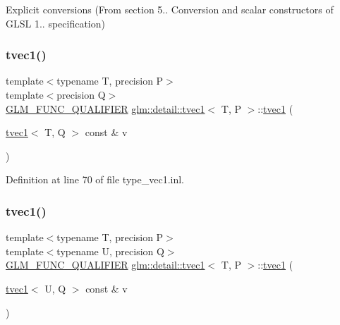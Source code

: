 Explicit conversions (From section 5.. Conversion and scalar constructors of G\+L\+SL 1.. specification) 

\mbox{\label{structglm_1_1detail_1_1tvec1_a78ba11094b516ebbb487a9c37714d7c0}} 
\subsubsection{\texorpdfstring{tvec1()}{tvec1()}\hspace{0.1cm}{\footnotesize\ttfamily [10/14]}}
{\footnotesize\ttfamily template$<$typename T, precision P$>$ \\
template$<$precision Q$>$ \\
\hyperlink{setup_8hpp_a33fdea6f91c5f834105f7415e2a64407}{G\+L\+M\+\_\+\+F\+U\+N\+C\+\_\+\+Q\+U\+A\+L\+I\+F\+I\+ER} \hyperlink{structglm_1_1detail_1_1tvec1}{glm\+::detail\+::tvec1}$<$ T, P $>$\+::\hyperlink{structglm_1_1detail_1_1tvec1}{tvec1} (\begin{DoxyParamCaption}\item[{\hyperlink{structglm_1_1detail_1_1tvec1}{tvec1}$<$ T, Q $>$ const \&}]{v }\end{DoxyParamCaption})}



Definition at line 70 of file type\+\_\+vec1.\+inl.

\mbox{\label{structglm_1_1detail_1_1tvec1_a608940c30970eec33519348c3fedcb6f}} 
\subsubsection{\texorpdfstring{tvec1()}{tvec1()}\hspace{0.1cm}{\footnotesize\ttfamily [11/14]}}
{\footnotesize\ttfamily template$<$typename T, precision P$>$ \\
template$<$typename U, precision Q$>$ \\
\hyperlink{setup_8hpp_a33fdea6f91c5f834105f7415e2a64407}{G\+L\+M\+\_\+\+F\+U\+N\+C\+\_\+\+Q\+U\+A\+L\+I\+F\+I\+ER} \hyperlink{structglm_1_1detail_1_1tvec1}{glm\+::detail\+::tvec1}$<$ T, P $>$\+::\hyperlink{structglm_1_1detail_1_1tvec1}{tvec1} (\begin{DoxyParamCaption}\item[{\hyperlink{structglm_1_1detail_1_1tvec1}{tvec1}$<$ U, Q $>$ const \&}]{v }\end{DoxyParamCaption})}



